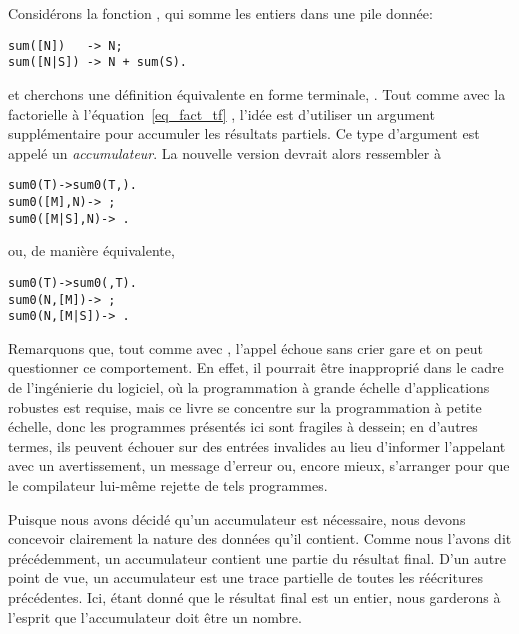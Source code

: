Considérons la fonction , qui somme les entiers dans
une pile donnée:
\begin{verbatim}
sum([N])   -> N;
sum([N|S]) -> N + sum(S).
\end{verbatim}
et cherchons une définition équivalente en forme terminale,
. Tout comme avec la factorielle à
l'équation~\eqref{eq_fact_tf} , l'idée est
d'utiliser un argument supplémentaire pour accumuler les résultats
partiels. Ce type d'argument est appelé un \emph{accumulateur}. La
nouvelle version devrait alors ressembler à
\begin{alltt}
sum0(T)       -> sum0(T,).
sum0([M],N)   -> \,;
sum0([M|S],N) -> \,.
\end{alltt}
ou, de manière équivalente,
\begin{alltt}
sum0(T)       -> sum0(,T).
sum0(N,[M])   -> \,;
sum0(N,[M|S]) -> \,.
\end{alltt}
Remarquons que, tout comme avec , l'appel
 échoue sans crier gare et on peut questionner ce
comportement. En effet, il pourrait être inapproprié dans le cadre de
l'ingénierie du logiciel, où la programmation à grande échelle
d'applications robustes est requise, mais ce livre se concentre sur la
programmation à petite échelle, donc les programmes présentés ici sont
fragiles à dessein; en d'autres termes, ils peuvent échouer sur des
entrées invalides au lieu d'informer l'appelant avec un avertissement,
un message d'erreur ou, encore mieux, s'arranger pour que le
compilateur lui-même rejette de tels programmes.

Puisque nous avons décidé qu'un accumulateur est nécessaire, nous
devons concevoir clairement la nature des données qu'il
contient. Comme nous l'avons dit précédemment, un accumulateur
contient une partie du résultat final. D'un autre point de vue, un
accumulateur est une trace partielle de toutes les réécritures
précédentes. Ici, étant donné que le résultat final est un entier,
nous garderons à l'esprit que l'accumulateur doit être un nombre.

